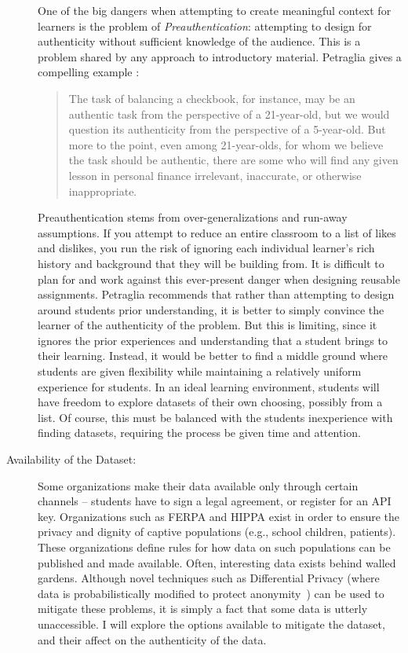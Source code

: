 \begin{description}
One of the big dangers when attempting to create meaningful context for learners is the problem of \textit{Preauthentication}: attempting to design for authenticity without sufficient knowledge of the audience. This is a problem shared by any approach to introductory material. Petraglia gives a compelling example \cite{preauthentication}:
	
\begin{quotation}
    The task of balancing a checkbook, for instance, may be an authentic task from the perspective of a 21-year-old, but we would question its authenticity from the perspective of a 5-year-old. But more to the point, even among 21-year-olds, for whom we believe the task should be authentic, there are some who will find any given lesson in personal finance irrelevant, inaccurate, or otherwise inappropriate. 
\end{quotation}
Preauthentication stems from over-generalizations and run-away assumptions.
If you attempt to reduce an entire classroom to a list of likes and dislikes, you run the risk of ignoring each individual learner's rich history and background that they will be building from. 
It is difficult to plan for and work against this ever-present danger when designing reusable assignments. 
Petraglia \cite{preauthentication} recommends that rather than attempting to design around students prior understanding, it is better to simply convince the learner of the authenticity of the problem.
But this is limiting, since it ignores the prior experiences and understanding that a student brings to their learning.
Instead, it would be better to find a middle ground where students are given flexibility while maintaining a relatively uniform experience for students.
In an ideal learning environment, students will have freedom to explore datasets of their own choosing, possibly from a list.
Of course, this must be balanced with the students inexperience with finding datasets, requiring the process be given time and attention.
	
	\item[Availability of the Dataset:] Some organizations make their data available only through certain channels -- students have to sign a legal agreement, or register for an API key. Organizations such as FERPA and HIPPA exist in order to ensure the privacy and dignity of captive populations (e.g., school children, patients). These organizations define rules for how data on such populations can be published and made available. Often, interesting data exists behind walled gardens. Although novel techniques such as Differential Privacy (where data is probabilistically modified to protect anonymity~\cite{dwork2011differential}) can be used to mitigate these problems, it is simply a fact that some data is utterly unaccessible. I will explore the options available to mitigate the dataset, and their affect on the authenticity of the data.
	

\end{description}
